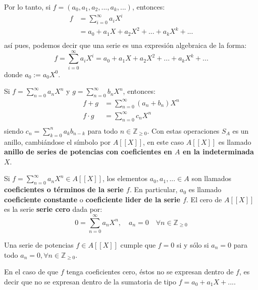 \documentclass[12pt]{report}
\theoremstyle{largebreak}
\begin{document}
\begin{mydef}
\begin{equation*}
        \end{equation*}
        Por lo tanto, si $f=(a_0,a_1,a_2,...,a_k,...)$, entonces:
        \begin{equation*}
            \begin{split}
                f&=\sum_{i=0}^\infty a_iX^i\\
                &=a_0+a_1X+a_2X^2+...+a_kX^k+...\\
            \end{split}
        \end{equation*}
        así pues, podemos decir que una serie es una expresión algebraica de la forma:
        \begin{equation}
            f=\sum_{i=0}^\infty a_iX^i=a_0+a_1X+a_2X^2+...+a_kX^k+...
        \end{equation}
        donde $a_0:=a_0X^0$.

        Si $f=\sum_{ n=0}^\infty a_nX^n$ y $g=\sum_{ n=0}^\infty b_nX^n$, entonces:
        \begin{equation*}
            \begin{split}
                f+g&=\sum_{n=0}^\infty(a_n+b_n)X^n\\
                f\cdot g&=\sum_{ n=0}^\infty c_nX^n\\
            \end{split}
        \end{equation*}
        siendo $c_n=\sum_{ k=0}^n a_kb_{ n-k}$ para todo $n\in\mathbb{Z}_{\geq0}$. Con estas operaciones $S_A$ es un anillo, cambiándose el símbolo por $A[[X]]$, en este caso $A[[X]]$ es llamado \textbf{anillo de series de potencias con coeficientes en $A$ en la indeterminada $X$}.

        Si $f=\sum_{ n=0}^\infty a_nX^n\in A[[X]]$, los elementos $a_0,a_1,...\in A$ son llamados \textbf{coeficientes o términos de la serie $f$}. En particular, $a_0$ es llamado \textbf{coeficiente constante} o \textbf{coeficiente lider de la serie $f$}. El cero de $A[[X]]$ es la serie \textbf{serie cero} dada por:
        \begin{equation*}
            0=\sum_{ n=0}^\infty a_nX^n,\quad a_n=0\quad\forall n\in\mathbb{Z}_{ \geq0}
        \end{equation*}
    \end{mydef}

    \begin{obs}
        Una serie de potencias $f\in A[[X]]$ cumple que $f=0$ si y sólo si $a_n=0$ para todo $a_n=0,\forall n\in\mathbb{Z}_{\geq0}$.

        En el caso de que $f$ tenga coeficientes cero, éstos no se expresan dentro de $f$, es decir que no se expresan dentro de la sumatoria de tipo $f=a_0+a_1X+...$.
    \end{obs}
\end{document}
